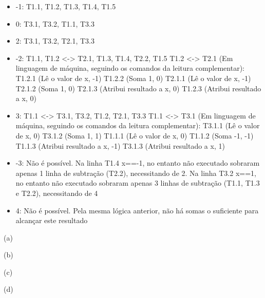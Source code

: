 \documentclass{homework}
\begin{document}
\exercise*
\begin{itemize}
    \item -1: T1.1, T1.2, T1.3, T1.4, T1.5
    \item 0: T3.1, T3.2, T1.1, T3.3
    \item 2: T3.1, T3.2, T2.1, T3.3
    \item -2: T1.1, T1.2 <-> T2.1, T1.3, T1.4, T2.2, T1.5
    \subitem T1.2 <-> T2.1 (Em linguagem de máquina, seguindo os comandos da leitura complementar):
    \subsubitem T1.2.1 (Lê o valor de x, -1)
    \subsubitem T1.2.2 (Soma 1, 0)
    \subsubitem T2.1.1 (Lê o valor de x, -1)
    \subsubitem T2.1.2 (Soma 1, 0)
    \subsubitem T2.1.3 (Atribui resultado a x, 0)
    \subsubitem T1.2.3 (Atribui resultado a x, 0)
    \item 3: T1.1 <-> T3.1, T3.2, T1.2, T2.1, T3.3
    \subitem T1.1 <-> T3.1 (Em linguagem de máquina, seguindo os comandos da leitura complementar):
    \subsubitem T3.1.1 (Lê o valor de x, 0)
    \subsubitem T3.1.2 (Soma 1, 1)
    \subsubitem T1.1.1 (Lê o valor de x, 0)
    \subsubitem T1.1.2 (Soma -1, -1)
    \subsubitem T1.1.3 (Atribui resultado a x, -1)
    \subsubitem T3.1.3 (Atribui resultado a x, 1)
    \item -3: Não é possível. Na linha T1.4 x==-1, no entanto não executado sobraram apenas 1 linha de subtração (T2.2), necessitando de 2. Na linha T3.2 x==1, no entanto não executado sobraram apenas 3 linhas de subtração (T1.1, T1.3 e T2.2), necessitando de 4
    \item 4: Não é possível. Pela mesma lógica anterior, não há somas o suficiente para alcançar este resultado
\end{itemize}

\exercise*

(a)

(b)

(c)

(d)
\end{document}
